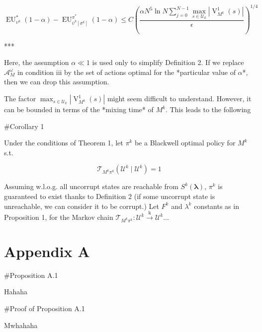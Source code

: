 \documentclass[a4paper]{article}
\newcommand{\AP}[1]{\left(#1\right)}
\newcommand{\Estr}{\boldsymbol{\lambda}}
\newcommand{\Abs}[1]{\left\vert #1 \right\vert}
\newcommand{\M}{\xrightarrow{\text{k}}}
\newcommand{\A}{\mathcal{A}}
\newcommand{\T}{\mathcal{T}}
\newcommand{\UC}{\mathcal{U}}
\newcommand{\V}{\operatorname{V}}
\newcommand{\EU}{\operatorname{EU}}
\begin{document}
$$\EU_{\upsilon^k}^*(1-\alpha) - \EU_{\bar{\upsilon}^k\left[\sigma^k\right]}^{\pi^*}(1-\alpha) \leq C\AP{\frac{\alpha N^5 \ln{N} \sum_{j = 0}^{N-1} \max_{s \in \UC_k} \Abs{\V^1_{M^k}(s)}}{\epsilon}}^{1/4}$$

***

Here, the assumption $\alpha \ll 1$ is used only to simplify Definition 2. If we replace $\A_M^\omega$ in condition iii by the set of actions optimal for the *particular value of $\alpha$*, then we can drop this assumption. 

The factor $\max_{s \in \UC_k} \Abs{\V^1_{M^k}(s)}$ might seem difficult to understand. However, it can be bounded in terms of the *mixing time* of $M^k$. This leads to the following

\#Corollary 1

Under the conditions of Theorem 1, let $\pi^k$ be a Blackwell optimal policy for $M^k$ s.t. 

$$\T_{M^k \pi^k}\AP{\UC^k \mid \UC^k} = 1$$ 

Assuming w.l.o.g. all uncorrupt states are reachable from $S^k(\Estr)$, $\pi^k$ is guaranteed to exist thanks to Definition 2 (if some uncorrupt state is unreachable, we can consider it to be corrupt.) Let $F^k$ and $\lambda^k$ constants as in Proposition 1, for the Markov chain $\T_{M^k\pi^k}: \UC^k \M \UC^k$...

\section{Appendix A}

\#Proposition A.1

Hahaha

\#Proof of Proposition A.1

Mwhahaha
\end{document}
